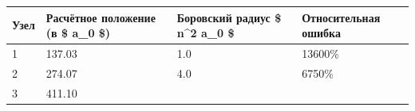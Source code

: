 \documentclass[11pt]{article}
\begin{document}
\begin{longtable}[]{@{}llll@{}}
\toprule
\begin{minipage}[b]{0.07\columnwidth}\raggedright\strut
Узел\strut
\end{minipage} & \begin{minipage}[b]{0.31\columnwidth}\raggedright\strut
Расчётное положение (в \$ a\_0 \$)\strut
\end{minipage} & \begin{minipage}[b]{0.29\columnwidth}\raggedright\strut
Боровский радиус \$ n\^{}2 a\_0 \$\strut
\end{minipage} & \begin{minipage}[b]{0.22\columnwidth}\raggedright\strut
Относительная ошибка\strut
\end{minipage}\tabularnewline
\midrule
\endhead
\begin{minipage}[t]{0.07\columnwidth}\raggedright\strut
1\strut
\end{minipage} & \begin{minipage}[t]{0.31\columnwidth}\raggedright\strut
137.03\strut
\end{minipage} & \begin{minipage}[t]{0.29\columnwidth}\raggedright\strut
1.0\strut
\end{minipage} & \begin{minipage}[t]{0.22\columnwidth}\raggedright\strut
13600\%\strut
\end{minipage}\tabularnewline
\begin{minipage}[t]{0.07\columnwidth}\raggedright\strut
2\strut
\end{minipage} & \begin{minipage}[t]{0.31\columnwidth}\raggedright\strut
274.07\strut
\end{minipage} & \begin{minipage}[t]{0.29\columnwidth}\raggedright\strut
4.0\strut
\end{minipage} & \begin{minipage}[t]{0.22\columnwidth}\raggedright\strut
6750\%\strut
\end{minipage}\tabularnewline
\begin{minipage}[t]{0.07\columnwidth}\raggedright\strut
3\strut
\end{minipage} & \begin{minipage}[t]{0.31\columnwidth}\raggedright\strut
411.10\strut
\end{minipage} & \begin{minipage}[t]{0.29\columnwidth}\raggedright\strut

\end{minipage}
\end{longtable}
\end{document}
